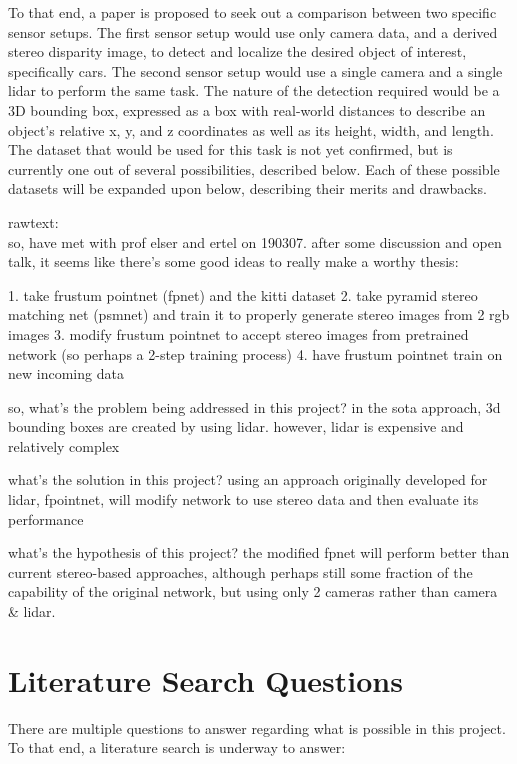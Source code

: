 To that end, a paper is proposed to seek out a comparison between two specific sensor setups. The first sensor setup would use only camera data, and a derived stereo disparity image, to detect and localize the desired object of interest, specifically cars. The second sensor setup would use a single camera and a single lidar to perform the same task. The nature of the detection required would be a 3D bounding box, expressed as a box with real-world distances to describe an object's relative x, y, and z coordinates as well as its height, width, and length. The dataset that would be used for this task is not yet confirmed, but is currently one out of several possibilities, described below. Each of these possible datasets will be expanded upon below, describing their merits and drawbacks.


rawtext: \\
so, have met with prof elser and ertel on 190307. after some discussion and open talk, it seems like there's some good ideas to really make a worthy thesis: 

1. take frustum pointnet (fpnet) and the kitti dataset
2. take pyramid stereo matching net (psmnet) and train it to properly generate stereo images from 2 rgb images
3. modify frustum pointnet to accept stereo images from pretrained network (so perhaps a 2-step training process)
4. have frustum pointnet train on new incoming data

so, what's the problem being addressed in this project? 
in the sota approach, 3d bounding boxes are created by using lidar. however, lidar is expensive and relatively complex

what's the solution in this project? 
using an approach originally developed for lidar, fpointnet, will modify network to use stereo data and then evaluate its performance

what's the hypothesis of this project?
the modified fpnet will perform better than current stereo-based approaches, although perhaps still some fraction of the capability of the original network, but using only 2 cameras rather than camera & lidar.




\section{Literature Search Questions}
There are multiple questions to answer regarding what is possible in this project. To that end, a literature search is underway to answer:

